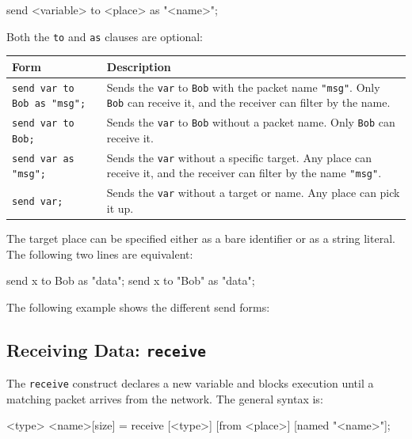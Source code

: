 \begin{codebox}
send <variable> to <place> as "<name>";
\end{codebox}

Both the \texttt{to} and \texttt{as} clauses are optional:

\begin{center}
\begin{tabular}{|l|p{9cm}|}
\hline
\textbf{Form} & \textbf{Description} \\
\hline
\texttt{send var to Bob as "msg";} &
    Sends the \texttt{var} to \texttt{Bob} with the packet name \texttt{"msg"}. Only
    \texttt{Bob} can receive it, and the receiver can filter by the name. \\
\hline
\texttt{send var to Bob;} &
    Sends the \texttt{var} to \texttt{Bob} without a packet name. Only \texttt{Bob}
    can receive it. \\
\hline
\texttt{send var as "msg";} &
    Sends the \texttt{var} without a specific target. Any place can receive it, and
    the receiver can filter by the name \texttt{"msg"}. \\
\hline
\texttt{send var;} &
    Sends the \texttt{var} without a target or name. Any place can pick it up. \\
\hline
\end{tabular}
\end{center}

The target place can be specified either as a bare identifier
or as a string literal. The following two lines are equivalent:

\begin{codebox}
send x to Bob as "data";
send x to "Bob" as "data";
\end{codebox}

The following example shows the different send forms:



\subsection{Receiving Data: \texttt{receive}}
\label{sec:receive}

The \texttt{receive} construct declares a new variable and blocks execution
until a matching packet arrives from the network. The general syntax is:

\begin{codebox}
<type> <name>[size] = receive [<type>] [from <place>] [named "<name>"];
\end{codebox}

